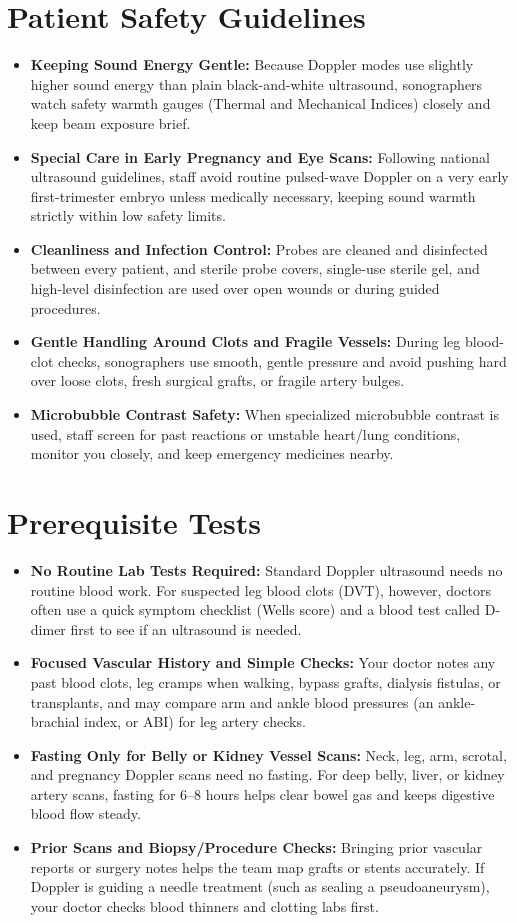 \section{Patient Safety Guidelines}
\begin{itemize}
\item \textbf{Keeping Sound Energy Gentle:} Because Doppler modes use slightly higher sound energy than plain black-and-white ultrasound, sonographers watch safety warmth gauges (Thermal and Mechanical Indices) closely and keep beam exposure brief.
\item \textbf{Special Care in Early Pregnancy and Eye Scans:} Following national ultrasound guidelines, staff avoid routine pulsed-wave Doppler on a very early first-trimester embryo unless medically necessary, keeping sound warmth strictly within low safety limits.
\item \textbf{Cleanliness and Infection Control:} Probes are cleaned and disinfected between every patient, and sterile probe covers, single-use sterile gel, and high-level disinfection are used over open wounds or during guided procedures.
\item \textbf{Gentle Handling Around Clots and Fragile Vessels:} During leg blood-clot checks, sonographers use smooth, gentle pressure and avoid pushing hard over loose clots, fresh surgical grafts, or fragile artery bulges.
\item \textbf{Microbubble Contrast Safety:} When specialized microbubble contrast is used, staff screen for past reactions or unstable heart/lung conditions, monitor you closely, and keep emergency medicines nearby.
\end{itemize}

\section{Prerequisite Tests}
\begin{itemize}
\item \textbf{No Routine Lab Tests Required:} Standard Doppler ultrasound needs no routine blood work. For suspected leg blood clots (DVT), however, doctors often use a quick symptom checklist (Wells score) and a blood test called D-dimer first to see if an ultrasound is needed.
\item \textbf{Focused Vascular History and Simple Checks:} Your doctor notes any past blood clots, leg cramps when walking, bypass grafts, dialysis fistulas, or transplants, and may compare arm and ankle blood pressures (an ankle-brachial index, or ABI) for leg artery checks.
\item \textbf{Fasting Only for Belly or Kidney Vessel Scans:} Neck, leg, arm, scrotal, and pregnancy Doppler scans need no fasting. For deep belly, liver, or kidney artery scans, fasting for 6--8 hours helps clear bowel gas and keeps digestive blood flow steady.
\item \textbf{Prior Scans and Biopsy/Procedure Checks:} Bringing prior vascular reports or surgery notes helps the team map grafts or stents accurately. If Doppler is guiding a needle treatment (such as sealing a pseudoaneurysm), your doctor checks blood thinners and clotting labs first.
\end{itemize}

